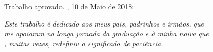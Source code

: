 \documentclass[
	12pt,				%
	openany,			%
	twoside,			%
	a4paper,			%
	english,			%
	french,				%
	spanish,			%
	brazil				%
	]{abntex2}
\begin{document}
%
% 
%
\begin{folhadeaprovacao}

  \begin{center}
    {\ABNTEXchapterfont\large\imprimirautor}

    \vspace*{\fill}\vspace*{\fill}
    \begin{center}
      \ABNTEXchapterfont\bfseries\Large\imprimirtitulo
    \end{center}
    \vspace*{\fill}
    
    \hspace{.45\textwidth}
    \begin{minipage}{.5\textwidth}
        \imprimirpreambulo
    \end{minipage}%
    \vspace*{\fill}
   \end{center}
        
   Trabalho aprovado. \imprimirlocal, 10 de Maio de 2018:

      
   \begin{center}
    \vspace*{0.5cm}
    {\large\imprimirlocal}
    \par
    {\large\imprimirdata}
    \vspace*{1cm}
  \end{center}
  
\end{folhadeaprovacao}

\begin{dedicatoria}
   \vspace*{\fill}
   \centering
   \noindent
   \textit{ Este trabalho é dedicado aos meus pais, padrinhos e irmãos, que \\
   me apoiaram na longa jornada da graduação e à minha noiva que \\
   , muitas vezes, redefiniu o significado de paciência.} \vspace*{\fill}
\end{dedicatoria}
\end{document}
